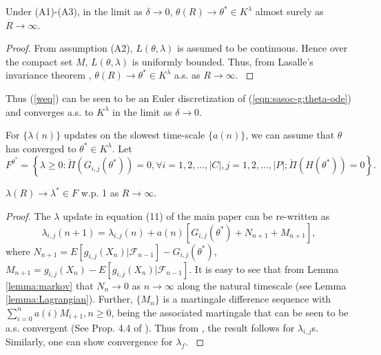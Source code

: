 \documentclass[11pt,letterpaper,english]{article}
\begin{document}
\begin{theorem}
Under (A1)-(A3), in the limit as $\delta \rightarrow 0$,
$\theta(R) \rightarrow \theta^* \in K^{\lambda}$ almost surely as $R \rightarrow \infty$.
\begin{proof}
{\rm
From assumption (A2), $L(\theta, \lambda)$ is assumed to be continuous. Hence over the compact set $M$, $L(\theta, \lambda)$ is uniformly bounded. Thus, from Lasalle's invariance theorem \cite{lasalle} \cite[Theorem 2.3, pp. 76]{kushner-yin}, $\theta(R) \rightarrow \theta^* \in K^{\lambda}$ a.s. as $R \rightarrow \infty$.
}
\end{proof}
\end{theorem}

Thus (\ref{weq}) can be seen to be an Euler discretization of (\ref{eqn:sasoc-g:theta-ode}) and converges a.s. to $K^{\lambda}$ in the limit as $\delta \rightarrow 0$.

For $\{\lambda(n)\}$ updates on the slowest time-scale $\{a(n)\}$, we can assume that $\theta$ has converged to $\theta^* \in K^\lambda$. Let \[F^{\theta^*} = \left \{ \lambda \ge 0 : \check\Pi \left ( G_{i, j}(\theta^*) \right ) = 0, \forall i = 1, 2, \dots, |C|, j = 1, 2, \dots, |P|; \check\Pi \left ( H(\theta^*) \right ) = 0 \right \}.\]




\begin{theorem}
\label{theorem:sasoc-g-lambda}
$\lambda(R) \rightarrow \lambda^* \in F$ w.p. 1 as $R \rightarrow \infty$.
\begin{proof}
{\rm
The $\lambda$ update in equation (11) of the main paper can be re-written as
\[\lambda_{i, j}(n + 1) = \lambda_{i, j}(n) + a(n) \left [ G_{i, j}(\theta^*) + N_{n + 1} + M_{n + 1} \right ],\]
where $N_{n + 1} = E[ g_{i, j}(X_n) | \mathcal{F}_{n - 1} ] - G_{i, j}(\theta^*)$, $M_{n + 1} = g_{i, j}(X_n) - E[ g_{i, j}(X_n) | \mathcal{F}_{n - 1} ]$. It is easy to see that from Lemma \ref{lemma:markov} that $N_{n} \rightarrow 0$ as $n \rightarrow \infty$ along the natural timescale (see Lemma \ref{lemma:Lagrangian}).
Further, $\{M_n\}$  is a martingale difference sequence with $\sum_{i = 0}^{n} a(i) M_{i + 1}, n \ge 0$, being the associated martingale that can be seen to be a.s. convergent (See Prop. 4.4 of \cite{shalabh2011constrained}).
 Thus from \cite[Extension 3 of Section 2.2]{borkar2008stochastic}, the result follows for $\lambda_{i, j}$s. Similarly, one can show convergence for $\lambda_f$.
}
\end{proof}
\end{theorem}
\end{document}
